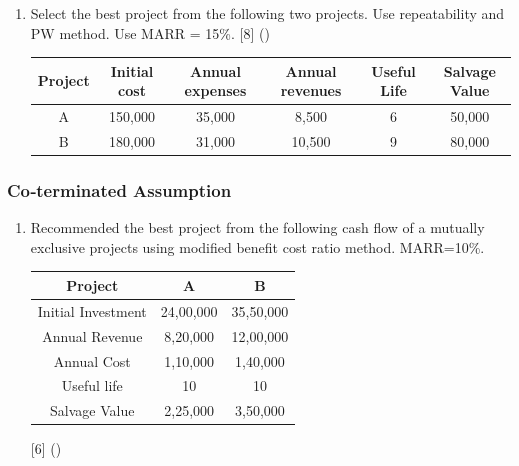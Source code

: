 \documentclass[12pt]{article}
\begin{document}
\begin{enumerate}
		\item Select the best project from the following two projects. Use repeatability and PW method. Use MARR = 15\%. \hfill [8] () \\
		\begin{tabular}{|c|c|c|c|c|c|}
			\hline
			Project & Initial cost & Annual expenses & Annual revenues & Useful Life & Salvage Value \\ \hline
			A & 150,000 & 35,000 & 8,500 & 6 & 50,000 \\ \hline
			B & 180,000 & 31,000 & 10,500 & 9 & 80,000 \\ \hline
		\end{tabular}
	\end{enumerate}
	
	\subsubsection{Co‐terminated Assumption}
		\begin{enumerate}[noitemsep, topsep=0pt]
			\item Recommended the best project from the following cash flow of a mutually exclusive projects using modified benefit cost ratio method. MARR=10\%. \\ 
			\begin{tabular}{|c|c|c|}
			\hline
			Project & A & B \\ \hline
			Initial Investment & 24,00,000 & 35,50,000 \\ \hline
			Annual Revenue & 8,20,000 & 12,00,000 \\ \hline
			Annual Cost & 1,10,000 & 1,40,000 \\ \hline
			Useful life & 10 & 10 \\ \hline
			Salvage Value & 2,25,000 & 3,50,000 \\ \hline
		\end{tabular} \hfill [6] ()
		\end{enumerate}
\end{document}
